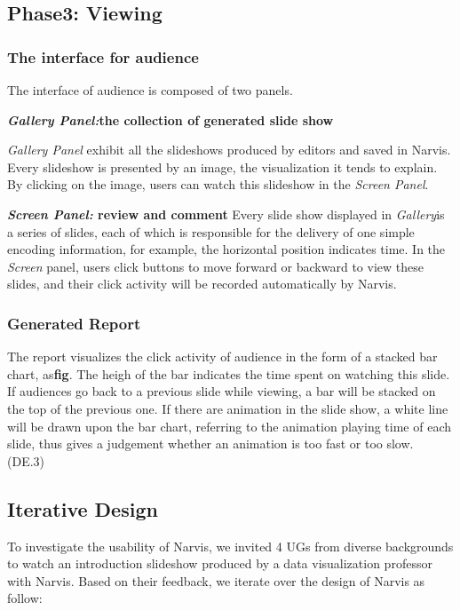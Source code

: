 \subsection{Phase3: Viewing}
\subsubsection{The interface for audience}
The interface of audience is composed of two panels.

\textbf{\textit{Gallery Panel:}the collection of generated slide show}
 
\textit{Gallery Panel} exhibit all the slideshows produced by editors and saved in Narvis. Every slideshow is presented by an image, the visualization it tends to explain. By clicking on the image, users can watch this slideshow in the \textit{Screen Panel}. 

\textbf{\textit{Screen Panel:}  review and comment}
Every slide show displayed in \textit{Gallery}is a series of slides, each of which is responsible for the delivery of one simple encoding information, for example, the horizontal position indicates time. In the \textit{Screen} panel, users click buttons to move forward or backward to view these slides, and their click activity will be recorded automatically by Narvis. 
\subsubsection{Generated Report}
The report visualizes the click activity of audience in the form of a stacked bar chart, as\textbf{fig}. The heigh of the bar indicates the time spent on watching this slide. If audiences go back to a previous slide while viewing, a bar will be stacked on the top of the previous one. If there are animation in the slide show, a white line will be drawn upon the bar chart, referring to the animation playing time of each slide, thus gives a judgement whether an animation is too fast or too slow. (DE.3)
\subsection{Iterative Design}
To investigate the usability of Narvis, we invited 4 UGs from diverse backgrounds to watch an introduction slideshow produced by a data visualization professor with Narvis. 
Based on their feedback, we iterate over the design of Narvis as follow:
